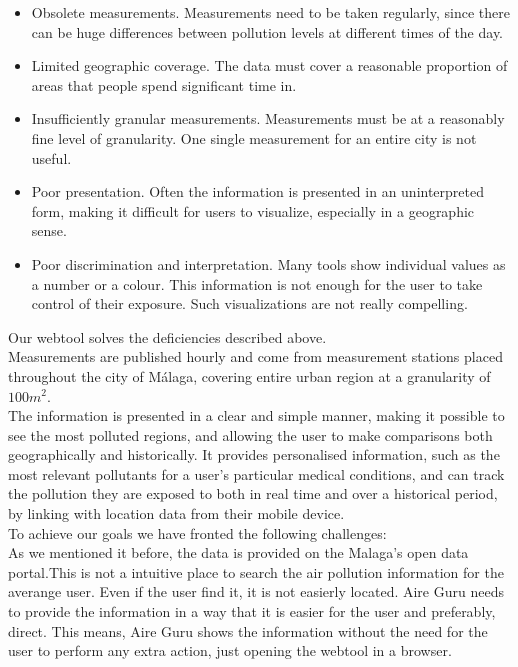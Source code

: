 \begin{itemize}

\item Obsolete measurements. Measurements need to be taken regularly, since there can be huge differences
between pollution levels at different times of the day.

\item Limited geographic coverage. The data must cover a reasonable proportion of areas that people spend significant time in.

\item Insufficiently granular measurements. Measurements must be at a reasonably fine level of granularity. One single measurement for an entire city is not useful.

\item Poor presentation. Often the information is presented in an uninterpreted form, making it difficult for users to visualize, especially in a geographic sense.

\item Poor discrimination and interpretation. Many tools show individual values as a number or a colour. This information is not
enough for the user to take control of their exposure. Such visualizations are not really compelling. 

\end{itemize}

Our webtool solves the deficiencies described above.\\

Measurements are published hourly and come from measurement stations placed throughout the 
city of Málaga, covering entire urban region at a granularity of $100m^2$.\\

The information is presented in a clear and simple manner, making it possible to see the most polluted regions,
and allowing the user to make comparisons both geographically and historically. It provides personalised information, such as the most relevant 
pollutants for a user's particular medical conditions, and can track
the pollution they are exposed to both in real time and over a historical period, by linking with location data from their mobile device. \\

To achieve our goals we have fronted the following challenges:\\

As we mentioned it before, the data is provided on the Malaga's open data portal.This is not a intuitive place to search the
air pollution information for the averange user. Even if the user find it, it is not 
easierly located. Aire Guru needs to provide the information in a way that it is easier for the user and preferably, direct.
This means, Aire Guru shows the information without the need for the user to perform any extra action, just opening the
webtool in a browser.\\

